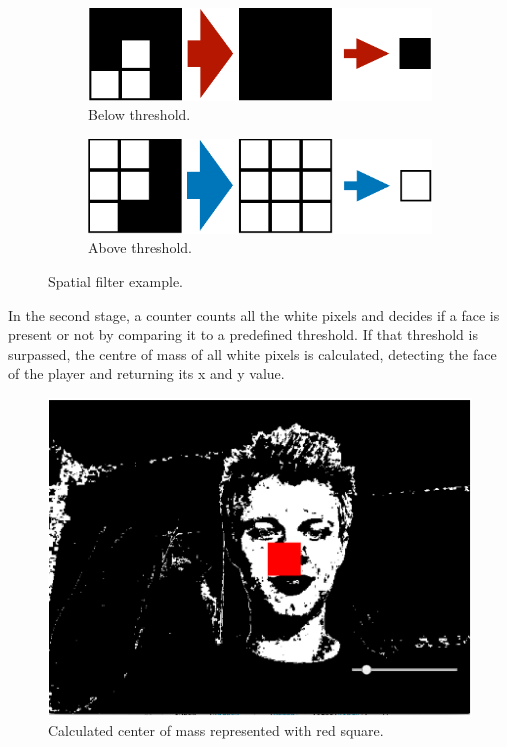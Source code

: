 \begin{figure}[H]
    \centering
    \begin{subfigure}[b]{0.45\textwidth}
        \centering
        \includegraphics[width=\textwidth]{img1}
        \caption{Below threshold.}
        \label{below}
    \end{subfigure}
    \hfill
    \begin{subfigure}[b]{0.45\textwidth}
        \centering
        \includegraphics[width=\textwidth]{img2}
        \caption{Above threshold.}
        \label{above}
    \end{subfigure}
    \hfill
    \caption{Spatial filter example.}
    \label{threshold}
\end{figure}

In the second stage, a counter counts all the white pixels and decides if a face is present or not by comparing it to a predefined threshold\cite[p.23]{inproceedings}. If that threshold is surpassed, the centre of mass of all white pixels is calculated, detecting the face of the player and returning its x and y value. 

\begin{figure}[H]
\centering
\includegraphics[scale=1]{final1}
\caption{Calculated center of mass represented with red square.}
\label{schematic}
\end{figure}

